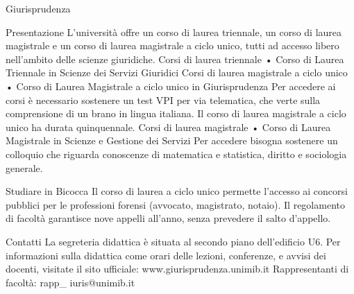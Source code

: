 Giurisprudenza

Presentazione
L'università offre un corso di laurea triennale, un corso di laurea magistrale e un corso di laurea magistrale a ciclo unico, tutti ad accesso libero nell'ambito delle scienze giuridiche.
Corsi di laurea triennale
     • Corso di Laurea Triennale in Scienze dei Servizi Giuridici 
Corsi di laurea magistrale a ciclo unico
     • Corso di Laurea Magistrale a ciclo unico in Giurisprudenza 
Per accedere ai corsi è necessario sostenere un test VPI per via telematica, che verte sulla comprensione di un brano in lingua italiana. Il corso di laurea magistrale a ciclo unico ha durata quinquennale. 
Corsi di laurea magistrale
     • Corso di Laurea Magistrale in Scienze e Gestione dei Servizi 
Per accedere bisogna sostenere un colloquio che riguarda conoscenze di matematica e statistica, diritto e sociologia generale. 

Studiare in Bicocca
Il corso di laurea a ciclo unico permette l'accesso ai concorsi pubblici per le professioni forensi (avvocato, magistrato, notaio). Il regolamento di facoltà garantisce nove appelli all'anno, senza prevedere il salto d'appello. 

Contatti
La segreteria didattica è situata al secondo piano dell'edificio U6. Per informazioni sulla didattica come orari delle lezioni, conferenze, e avvisi dei docenti, visitate il sito ufficiale: www.giurisprudenza.unimib.it 
Rappresentanti di facoltà:  rapp_ iuris@unimib.it 
